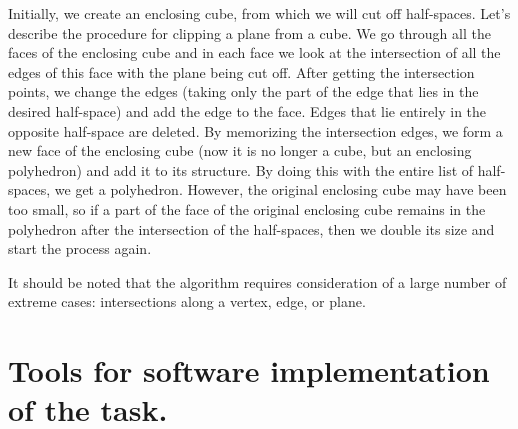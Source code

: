 \documentclass[11pt,fleqn,a4paper]{scrartcl}
\begin{document}
Initially, we create an enclosing cube, from which we will cut off half-spaces. Let's describe the procedure for clipping a plane from a cube. We go through all the faces of the enclosing cube and in each face we look at the intersection of all the edges of this face with the plane being cut off. After getting the intersection points, we change the edges (taking only the part of the edge that lies in the desired half-space) and add the edge to the face. Edges that lie entirely in the opposite half-space are deleted. By memorizing the intersection edges, we form a new face of the enclosing cube (now it is no longer a cube, but an enclosing polyhedron) and add it to its structure. By doing this with the entire list of half-spaces, we get a polyhedron. However, the original enclosing cube may have been too small, so if a part of the face of the original enclosing cube remains in the polyhedron after the intersection of the half-spaces, then we double its size and start the process again.
\par
It should be noted that the algorithm requires consideration of a large number of extreme cases: intersections along a vertex, edge, or plane.

\section{Tools for software implementation of the task.}
\end{document}
